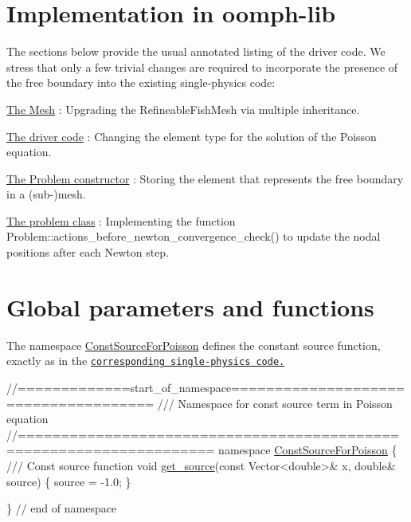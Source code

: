 

\hypertarget{index_impl}{}\section{Implementation in oomph-\/lib}\label{index_impl}
The sections below provide the usual annotated listing of the driver code. We stress that only a few trivial changes are required to incorporate the presence of the free boundary into the existing single-\/physics code\+:
\begin{DoxyItemize}
\item \hyperlink{index_mesh}{The Mesh} \+: Upgrading the {\ttfamily Refineable\+Fish\+Mesh} via multiple inheritance.
\item \hyperlink{index_main}{The driver code} \+: Changing the element type for the solution of the Poisson equation.
\item \hyperlink{index_constructor}{The Problem constructor} \+: Storing the element that represents the free boundary in a (sub-\/)mesh.
\item \hyperlink{index_problem}{The problem class} \+: Implementing the function {\ttfamily Problem\+::actions\+\_\+before\+\_\+newton\+\_\+convergence\+\_\+check()} to update the nodal positions after each Newton step.
\end{DoxyItemize}

 

\hypertarget{index_global}{}\section{Global parameters and functions}\label{index_global}
The namespace {\ttfamily \hyperlink{namespaceConstSourceForPoisson}{Const\+Source\+For\+Poisson}} defines the constant source function, exactly as in the \href{../../../poisson/fish_poisson/html/index.html#global}{\tt corresponding single-\/physics code.}

 
\begin{DoxyCodeInclude}
\textcolor{comment}{//=============start\_of\_namespace=====================================}
\textcolor{comment}{/// Namespace for const source term in Poisson equation}
\textcolor{comment}{}\textcolor{comment}{//====================================================================}
\textcolor{keyword}{namespace }\hyperlink{namespaceConstSourceForPoisson}{ConstSourceForPoisson}
\{
\textcolor{comment}{}
\textcolor{comment}{/// Const source function}
\textcolor{comment}{} \textcolor{keywordtype}{void} \hyperlink{namespaceConstSourceForPoisson_a40ef79083874b58ed42b4df2ca0f4c10}{get\_source}(\textcolor{keyword}{const} Vector<double>& x, \textcolor{keywordtype}{double}& source)
 \{
  source = -1.0;
 \}
 
\} \textcolor{comment}{// end of namespace}

\end{DoxyCodeInclude}





